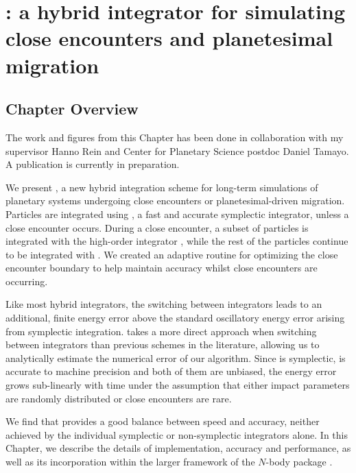 \chapter[\hermes: A hybrid integrator]{\hermes: a hybrid integrator for simulating close encounters and planetesimal migration}
\label{chap:Hermes}

\section{Chapter Overview}
	\begin{center}
	\begin{minipage}[c]{4.75in}
	The work and figures from this Chapter has been done in collaboration with my supervisor Hanno Rein and Center for Planetary Science postdoc Daniel Tamayo. 
	A publication is currently in preparation. 
	\vspace{2em}
	\end{minipage}
	\end{center}

We present \hermes, a new hybrid integration scheme for long-term simulations of planetary systems undergoing close encounters or planetesimal-driven migration. 
Particles are integrated using \whfast, a fast and accurate symplectic integrator, unless a close encounter occurs.
During a close encounter, a subset of particles is integrated with the high-order integrator \ias, while the rest of the particles continue to be integrated with \whfast.
We created an adaptive routine for optimizing the close encounter boundary to help maintain accuracy whilst close encounters are occurring.

Like most hybrid integrators, the switching between integrators leads to an additional, finite energy error above the standard oscillatory energy error arising from symplectic integration.
\hermes takes a more direct approach when switching between integrators than previous schemes in the literature, allowing us to analytically estimate the numerical error of our algorithm. 
Since \whfast is symplectic, \ias is accurate to machine precision and both of them are unbiased, the energy error grows sub-linearly with time under the assumption that either impact parameters are randomly distributed or close encounters are rare.

We find that \hermes provides a good balance between speed and accuracy, neither achieved by the individual symplectic or non-symplectic integrators alone.
In this Chapter, we describe the details of implementation, accuracy and performance, as well as its incorporation within the larger framework of the $N$-body package \reb. 

